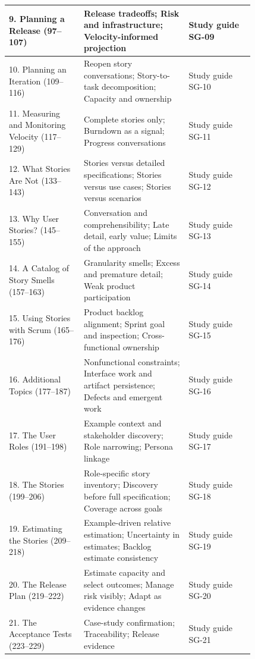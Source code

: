 \documentclass[11pt,letterpaper]{article}
\begin{document}
\begin{longtable}{|p{0.25\linewidth}|p{0.35\linewidth}|p{0.22\linewidth}|}
9. Planning a Release (97–107) & Release tradeoffs; Risk and infrastructure; Velocity-informed projection & Study guide SG-09 \\ \hline
10. Planning an Iteration (109–116) & Reopen story conversations; Story-to-task decomposition; Capacity and ownership & Study guide SG-10 \\ \hline
11. Measuring and Monitoring Velocity (117–129) & Complete stories only; Burndown as a signal; Progress conversations & Study guide SG-11 \\ \hline
12. What Stories Are Not (133–143) & Stories versus detailed specifications; Stories versus use cases; Stories versus scenarios & Study guide SG-12 \\ \hline
13. Why User Stories? (145–155) & Conversation and comprehensibility; Late detail, early value; Limits of the approach & Study guide SG-13 \\ \hline
14. A Catalog of Story Smells (157–163) & Granularity smells; Excess and premature detail; Weak product participation & Study guide SG-14 \\ \hline
15. Using Stories with Scrum (165–176) & Product backlog alignment; Sprint goal and inspection; Cross-functional ownership & Study guide SG-15 \\ \hline
16. Additional Topics (177–187) & Nonfunctional constraints; Interface work and artifact persistence; Defects and emergent work & Study guide SG-16 \\ \hline
17. The User Roles (191–198) & Example context and stakeholder discovery; Role narrowing; Persona linkage & Study guide SG-17 \\ \hline
18. The Stories (199–206) & Role-specific story inventory; Discovery before full specification; Coverage across goals & Study guide SG-18 \\ \hline
19. Estimating the Stories (209–218) & Example-driven relative estimation; Uncertainty in estimates; Backlog estimate consistency & Study guide SG-19 \\ \hline
20. The Release Plan (219–222) & Estimate capacity and select outcomes; Manage risk visibly; Adapt as evidence changes & Study guide SG-20 \\ \hline
21. The Acceptance Tests (223–229) & Case-study confirmation; Traceability; Release evidence & Study guide SG-21 \\ \hline
\end{longtable}
\end{document}
